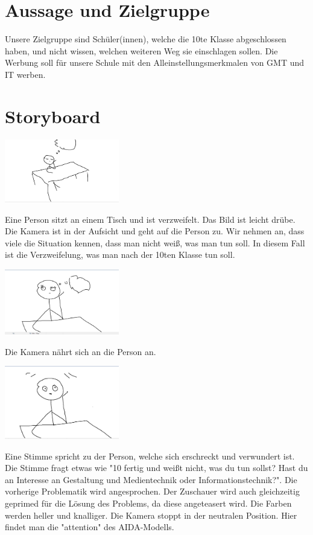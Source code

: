 \documentclass[8pt, letterpaper]{article}
\begin{document}
\tableofcontents

\section{Aussage und Zielgruppe}
Unsere Zielgruppe sind Schüler(innen), welche die 10te Klasse abgeschlossen haben, und nicht wissen, welchen weiteren Weg sie einschlagen sollen. Die Werbung soll für unsere Schule mit den Alleinstellungsmerkmalen von GMT und IT werben.

\section{Storyboard}
\includegraphics[width=5cm]{scene_1}

Eine Person sitzt an einem Tisch und ist verzweifelt. Das Bild ist leicht drübe. Die Kamera ist in der Aufsicht und geht auf die Person zu. Wir nehmen an, dass viele die Situation kennen, dass man nicht weiß, was man tun soll. In diesem Fall ist die Verzweifelung, was man nach der 10ten Klasse tun soll.

\includegraphics[width=5cm]{scene_2}

Die Kamera nährt sich an die Person an.

\includegraphics[width=5cm]{scene_3}

Eine Stimme spricht zu der Person, welche sich erschreckt und verwundert ist. Die Stimme fragt etwas wie "10 fertig und weißt nicht, was du tun sollst? Hast du an Interesse an Gestaltung und Medientechnik oder Informationstechnik?". Die vorherige Problematik wird angesprochen. Der Zuschauer wird auch gleichzeitig geprimed für die Lösung des Problems, da diese angeteasert wird. Die Farben werden heller und knalliger. Die Kamera stoppt in der neutralen Position. Hier findet man die "attention" des AIDA-Modells.
\end{document}
